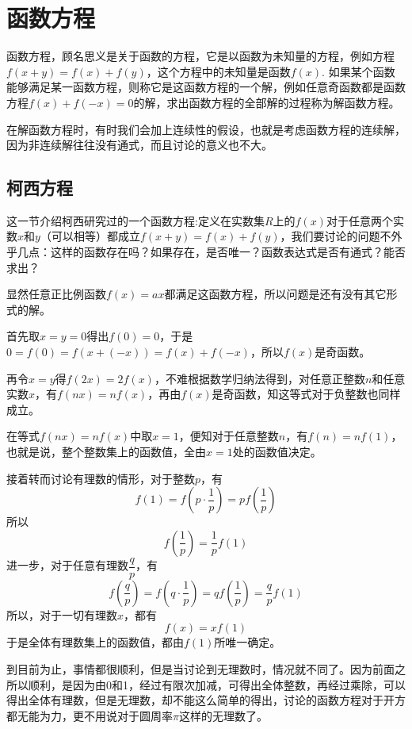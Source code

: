 
\section{函数方程}
\label{sec:function-equation}

函数方程，顾名思义是关于函数的方程，它是以函数为未知量的方程，例如方程$f(x+y)=f(x)+f(y)$，这个方程中的未知量是函数$f(x)$. 如果某个函数能够满足某一函数方程，则称它是这函数方程的一个解，例如任意奇函数都是函数方程$f(x)+f(-x)=0$的解，求出函数方程的全部解的过程称为解函数方程。

在解函数方程时，有时我们会加上连续性的假设，也就是考虑函数方程的连续解，因为非连续解往往没有通式，而且讨论的意义也不大。

\subsection{柯西方程}
\label{sec:cauchy-function-equality}

这一节介绍柯西研究过的一个函数方程:定义在实数集$R$上的$f(x)$对于任意两个实数$x$和$y$（可以相等）都成立$f(x+y)=f(x)+f(y)$，我们要讨论的问题不外乎几点：这样的函数存在吗？如果存在，是否唯一？函数表达式是否有通式？能否求出？

显然任意正比例函数$f(x)=ax$都满足这函数方程，所以问题是还有没有其它形式的解。

首先取$x=y=0$得出$f(0)=0$，于是$0=f(0)=f(x+(-x))=f(x)+f(-x)$，所以$f(x)$是奇函数。

再令$x=y$得$f(2x)=2f(x)$，不难根据数学归纳法得到，对任意正整数$n$和任意实数$x$，有$f(nx)=nf(x)$，再由$f(x)$是奇函数，知这等式对于负整数也同样成立。

在等式$f(nx)=nf(x)$中取$x=1$，便知对于任意整数$n$，有$f(n)=nf(1)$，也就是说，整个整数集上的函数值，全由$x=1$处的函数值决定。

接着转而讨论有理数的情形，对于整数$p$，有
\[ f(1)=f \left( p\cdot \frac{1}{p} \right) = p f \left( \frac{1}{p} \right) \]
所以
\[ f \left( \frac{1}{p} \right) = \frac{1}{p} f(1) \]
进一步，对于任意有理数$\dfrac{q}{p}$，有
\[ f \left( \frac{q}{p} \right) = f \left( q \cdot \frac{1}{p} \right) = q f \left( \frac{1}{p} \right) = \frac{q}{p} f(1) \]
所以，对于一切有理数$x$，都有
\[ f(x) = x f(1) \]
于是全体有理数集上的函数值，都由$f(1)$所唯一确定。

到目前为止，事情都很顺利，但是当讨论到无理数时，情况就不同了。因为前面之所以顺利，是因为由0和1，经过有限次加减，可得出全体整数，再经过乘除，可以得出全体有理数，但是无理数，却不能这么简单的得出，讨论的函数方程对于开方都无能为力，更不用说对于圆周率$\pi$这样的无理数了。


